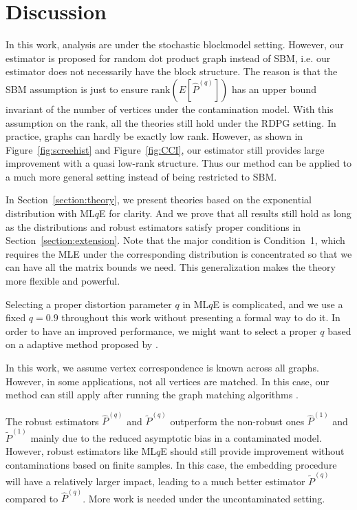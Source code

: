 \documentclass[a4paper]{article}
\renewcommand{\hat}{\widehat}
\begin{document}
\section{Discussion}

In this work, analysis are under the stochastic blockmodel setting. However, our estimator is proposed for random dot product graph instead of SBM, i.e. our estimator does not necessarily have the block structure. The reason is that the SBM assumption is just to ensure $\mathrm{rank}(E[\hat{P}^{(q)}])$ has an upper bound invariant of the number of vertices under the contamination model. With this assumption on the rank, all the theories still hold under the RDPG setting. In practice, graphs can hardly be exactly low rank. However, as shown in Figure~\ref{fig:screehist} and Figure~\ref{fig:CCI}, our estimator still provides large improvement with a quasi low-rank structure. Thus our method can be applied to a much more general setting instead of being restricted to SBM.

In Section~\ref{section:theory}, we present theories based on the exponential distribution with ML$q$E for clarity. And we prove that all results still hold as long as the distributions and robust estimators satisfy proper conditions in Section~\ref{section:extension}. Note that the major condition is Condition~1, which requires the MLE under the corresponding distribution is concentrated so that we can have all the matrix bounds we need. This generalization makes the theory more flexible and powerful.

Selecting a proper distortion parameter $q$ in ML$q$E is complicated, and we use a fixed $q = 0.9$ throughout this work without presenting a formal way to do it. In order to have an improved performance, we might want to select a proper $q$ based on a adaptive method proposed by \citet{qin2013robust}.

In this work, we assume vertex correspondence is known across all graphs. However, in some applications, not all vertices are matched. In this case, our method can still apply after running the graph matching algorithms \citep{lyzinski2016graph, lyzinski2015spectral, lyzinski2014seeded}.

The robust estimators $\hat{P}^{(q)}$ and $\widetilde{P}^{(q)}$ outperform the non-robust ones $\hat{P}^{(1)}$ and $\widetilde{P}^{(1)}$ mainly due to the reduced asymptotic bias in a contaminated model. However, robust estimators like ML$q$E should still provide improvement without contaminations based on finite samples. In this case, the embedding procedure will have a relatively larger impact, leading to a much better estimator $\widetilde{P}^{(q)}$ compared to $\hat{P}^{(q)}$. More work is needed under the uncontaminated setting.
\end{document}
